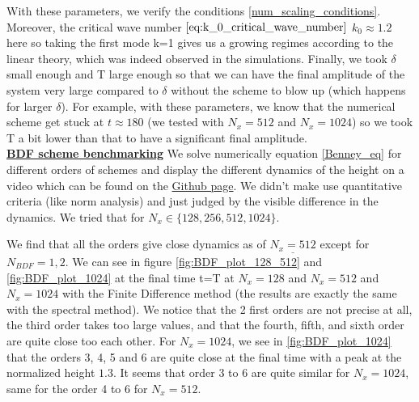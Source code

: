 \documentclass[12pt]{article}
\begin{document}
With these parameters, we verify the conditions \eqref{num_scaling_conditions}. Moreover, the critical wave number $\eqref{eq:k_0_critical_wave_number}$ $k_0\approx 1.2$ here so taking the first mode k=1 gives us a growing regimes according to the linear theory, which was indeed observed in the simulations. Finally, we took $\delta$ small enough and T large enough so that we can have the final amplitude of the system very large compared to $\delta$ without the scheme to blow up (which happens for larger $\delta$). For example, with these parameters, we know that the numerical scheme get stuck at $t\approx180$ (we tested with $N_x=512$ and $N_x=1024$) so we took T a bit lower than that to have a significant final amplitude. 
\\

\underline{\textbf{BDF scheme benchmarking}}
We solve numerically equation \eqref{Benney_eq} for different orders of schemes and display the different dynamics of the height on a video which can be found on the \href{https://github.com/Bilal59170/Repo_Warwick_internship}{Github page}. We didn't make use quantitative criteria (like norm analysis) and just judged by the visible difference in the dynamics. We tried that for $N_x \in \{128, 256, 512, 1024\}.$

We find that all the orders give close dynamics as of $\underline{N_x=512}$ except for $N_{BDF}=1, 2$. 
We can see in figure \ref{fig:BDF_plot_128_512}  and \eqref{fig:BDF_plot_1024} at the final time t=T at $N_x = 128$ and $N_x = 512$ and $N_x=1024$ with the Finite Difference method (the results are exactly the same with the spectral method). We notice that the 2 first orders are not precise at all, the third order takes too large values, and that the fourth, fifth, and sixth order are quite close too each other. For $N_x = 1024$, we see in \eqref{fig:BDF_plot_1024} that the orders 3, 4, 5 and 6 are quite close at the final time with a peak at the normalized height $1.3$. It seems that order 3 to 6 are quite similar for $N_x=1024$, same for the order 4 to 6 for $N_x=512.$
\end{document}
